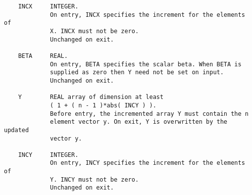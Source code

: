\documentclass[10pt]{book}
\begin{document}
\begin{verbatim}
    INCX     INTEGER.
             On entry, INCX specifies the increment for the elements of
             X. INCX must not be zero.
             Unchanged on exit.

    BETA     REAL.
             On entry, BETA specifies the scalar beta. When BETA is
             supplied as zero then Y need not be set on input.
             Unchanged on exit.

    Y        REAL array of dimension at least
             ( 1 + ( n - 1 )*abs( INCY ) ).
             Before entry, the incremented array Y must contain the n
             element vector y. On exit, Y is overwritten by the updated
             vector y.

    INCY     INTEGER.
             On entry, INCY specifies the increment for the elements of
             Y. INCY must not be zero.
             Unchanged on exit.
\end{verbatim}

\newpage
\end{document}
